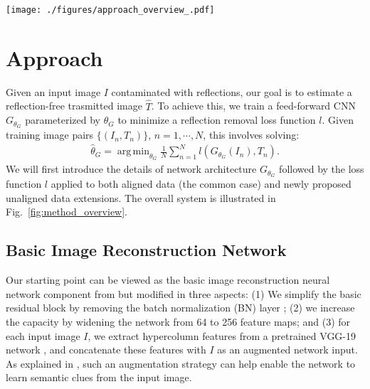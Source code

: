 \documentclass[10pt,twocolumn,letterpaper]{article}
\DeclareMathOperator*{\argmin}{arg\,min}
\begin{document}
\begin{figure*}
\vspace{-5pt}
	\centering
     \texttt{[image: ./figures/approach\_overview\_.pdf]}
     \vspace{-2pt}
	\caption{Overview of our approach for single image reflection removal.}\label{fig:method_overview}
\vspace{-1pt}
\end{figure*}

\section{Approach} \label{sec:approach}
Given an input image $I$ contaminated with reflections, our goal is to estimate a reflection-free trasmitted image $\hat{T}$.
To achieve this, we train a feed-forward CNN $G_{\theta_G}$ parameterized by $\theta_G$ to minimize a reflection removal loss function $l$. Given training image pairs $\{(I_n, T_n)\}$, $n = 1, \cdots, N$, this involves solving:
\begin{align}
\textstyle{\hat{\theta}_G =  \argmin_{\theta_G} \frac{1}{N} \sum_{n=1}^{N} l (G_{\theta_G} (I_n), T_n)}.
\end{align}
We will first introduce the details of network architecture $G_{\theta_G}$ followed by the loss function $l$ applied to both aligned data (the common case) and newly proposed unaligned data extensions.  The overall system is illustrated in Fig.~\ref{fig:method_overview}.

\subsection{Basic Image Reconstruction Network} \label{sec:eicnn}

Our starting point can be viewed as the basic image reconstruction neural network component from \cite{fan2017generic} but modified in three aspects: (1) We simplify the basic residual block \cite{He_2016_CVPR} by removing the batch normalization (BN) layer \cite{ioffe2015batch}; (2) we increase the  capacity by widening the network from 64 to 256 feature maps; and (3)  for each input image $I$,  we extract hypercolumn features \cite{Hariharan_2015_CVPR}  from a pretrained VGG-19 network \cite{DBLP:journals/corr/SimonyanZ14a}, and concatenate these features with $I$ as an augmented network input.  As explained in \cite{zhang2018single}, such an augmentation strategy can help enable the network to learn semantic clues from the input image.
\end{document}
